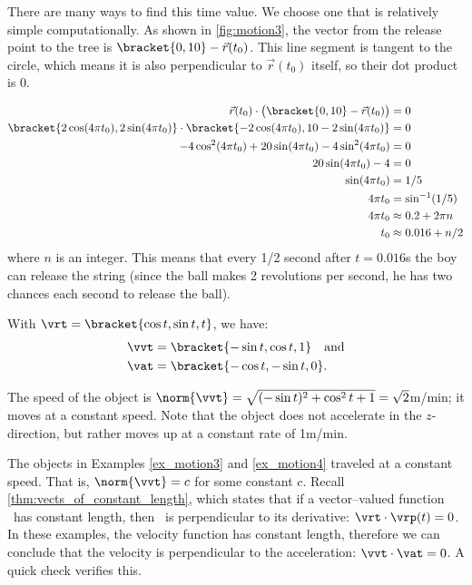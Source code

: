 {\begin{enumerate}
	There are many ways to find this time value. We choose one that is relatively simple computationally. As shown in \autoref{fig:motion3}, the vector from the release point to the tree is $\bracket{0,10}- \vec r(t_0)$. This line segment is tangent to the circle, which means it is also perpendicular to $\vec r(t_0)$ itself, so their dot product is 0.
	
	\begin{align*}
	\vec r(t_0) \cdot \big(\bracket{0,10}- \vec r(t_0)\big) &=0\\
	\bracket{2\cos (4\pi t_0), 2\sin (4\pi t_0)}\cdot\bracket{-2\cos(4\pi t_0),10-2\sin (4\pi t_0)}&=0\\
	-4\cos^2(4\pi t_0) + 20\sin (4\pi t_0)-4\sin^2(4\pi t_0) &= 0\\
	20\sin (4\pi t_0) - 4 &=0\\
	\sin (4\pi t_0) &=1/5\\
	4\pi t_0 &= \sin^{-1}(1/5)\\
	4\pi t_0 &\approx 0.2 + 2\pi n\\%
	t_0 &\approx 0.016 + n/2
	\end{align*}
	where $n$ is an integer.
	This means that every 1/2 second after $t=0.016$s the boy can release the string (since the ball makes 2 revolutions per second, he has two chances each second to release the ball).\eoehere
\end{enumerate}}

{With $\vrt =\bracket{\cos t,\sin t, t}$, we have:
\begin{align*}
\vvt &=\bracket{-\sin t, \cos t, 1}\quad \text{and} \\
\vat &=\bracket{-\cos t, -\sin t, 0}.
\end{align*}

The speed of the object is $\norm{\vvt} = \sqrt{(-\sin t)^2+\cos^2t+1} = \sqrt{2}$m/min; it moves at a constant speed. Note that the object does not accelerate in the $z$-direction, but rather moves up at a constant rate of 1m/min.}

The objects in Examples \ref{ex_motion3} and \ref{ex_motion4} traveled at a constant speed. That is, $\norm{\vvt} = c$ for some constant $c$. Recall \autoref{thm:vects_of_constant_length}, which states that if a vector--valued function \vrt\ has constant length, then \vrt\ is perpendicular to its derivative: $\vrt\cdot\vrp(t) = 0$. In these examples, the velocity function has constant length, therefore we can conclude that the velocity is perpendicular to the acceleration: $\vvt\cdot\vat = 0$. A quick check verifies this.

